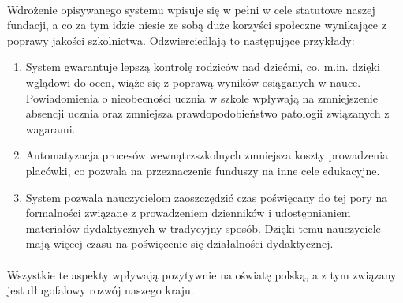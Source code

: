 \documentclass{article}
\begin{document}
\paragraph{}Wdrożenie opisywanego systemu wpisuje się w pełni w cele statutowe naszej fundacji, a co za tym idzie niesie ze sobą duże korzyści społeczne wynikające z poprawy jakości szkolnictwa. Odzwierciedlają to następujące przykłady:
\begin{enumerate}
\item System gwarantuje lepszą kontrolę rodziców nad dziećmi, co, m.in. dzięki wglądowi do ocen, wiąże się z poprawą wyników osiąganych w nauce. Powiadomienia o nieobecności ucznia w szkole wpływają na zmniejszenie absencji ucznia oraz zmniejsza prawdopodobieństwo patologii związanych z wagarami.

\item Automatyzacja procesów wewnątrzszkolnych zmniejsza koszty prowadzenia placówki, co pozwala na przeznaczenie funduszy na inne cele edukacyjne.

\item System pozwala nauczycielom zaoszczędzić czas poświęcany do tej pory na formalności związane z prowadzeniem dzienników i udostępnianiem materiałów dydaktycznych w tradycyjny sposób. Dzięki temu nauczyciele mają więcej czasu na poświęcenie się działalności dydaktycznej.

\end{enumerate}

\paragraph{}Wszystkie te aspekty wpływają pozytywnie na oświatę polską, a z tym związany jest długofalowy rozwój naszego kraju.
\end{document}
